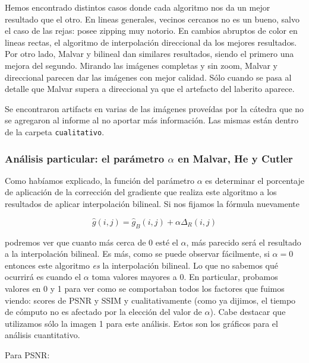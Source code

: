 \vspace{\baselineskip}

Hemos encontrado distintos casos donde cada algoritmo nos da un mejor resultado que el otro. En lineas generales, vecinos cercanos no es un bueno, salvo el caso de las rejas: posee zipping muy notorio. En cambios abruptos de color en lineas rectas, el algoritmo de interpolación direccional da los mejores resultados. Por otro lado, Malvar y bilineal dan similares resultados, siendo el primero una mejora del segundo. Mirando las imágenes completas y sin zoom, Malvar y direccional parecen dar las imágenes con mejor calidad. Sólo cuando se pasa al detalle que Malvar supera a direccional ya que el artefacto del laberito aparece.

Se encontraron artifacts en varias de las imágenes proveídas por la cátedra que no se agregaron al informe al no aportar más información. Las mismas están dentro de la carpeta \texttt{cualitativo}.

\subsubsection{Análisis particular: el parámetro $\alpha$ en Malvar, He y Cutler}

Como habíamos explicado, la función del parámetro $\alpha$ es determinar el porcentaje de aplicación de la corrección del gradiente que realiza este algoritmo a los resultados de aplicar interpolación bilineal. Si nos fijamos la fórmula nuevamente

\[ \hat{g}(i,j) = \hat{g}_B(i,j) + \alpha\Delta_R(i,j) \]

podremos ver que cuanto más cerca de 0 esté el $\alpha$, más parecido será el resultado a la interpolación bilineal. Es más, como se puede observar fácilmente, si $\alpha = 0$ entonces este algoritmo \textit{es} la interpolación bilineal. Lo que no sabemos qué ocurrirá es cuando el $\alpha$ toma valores mayores a 0. En particular, probamos valores en 0 y 1 para ver como se comportaban todos los factores que fuimos viendo: scores de PSNR y SSIM y cualitativamente (como ya dijimos, el tiempo de cómputo no es afectado por la elección del valor de $\alpha$). Cabe destacar que utilizamos sólo la imagen 1 para este análisis. Estos son los gráficos para el análisis cuantitativo.

\vspace{\baselineskip}

Para PSNR:

